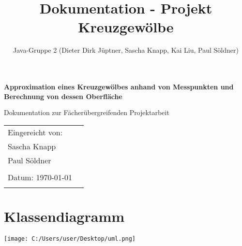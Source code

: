 \documentclass[11pt, bibliography=totocnumbered]{scrartcl}
\title{Dokumentation - Projekt Kreuzgew\"olbe}
\author{Java-Gruppe 2 (Dieter Dirk J\"uptner, Sascha Knapp, Kai Liu, Paul S\"oldner)}
\begin{document}
	\begin{titlepage}
		\begin{center}
			\vspace*{2cm}
			
			\huge
			\textbf{Approximation eines Kreuzgew\"olbes anhand von Messpunkten und Berechnung von dessen Oberfl\"ache}
			
			\vspace{1.5cm}
			\LARGE
			Dokumentation zur F\"acher\"ubergreifenden Projektarbeit
		\end{center}    
		\vspace{1cm}
		
		\vfill{}
		\large
		\begin{tabular}{@{}l l}
			Eingereicht von: & \\
			Sascha Knapp \\
			Paul S\"oldner \\
			\\
			Datum: \today \\
			\\
		\end{tabular}
		\vfill
	\end{titlepage}
\newpage
\tableofcontents
\newpage
\section{Klassendiagramm}
\texttt{[image: C:/Users/user/Desktop/uml.png]}
\end{document}

